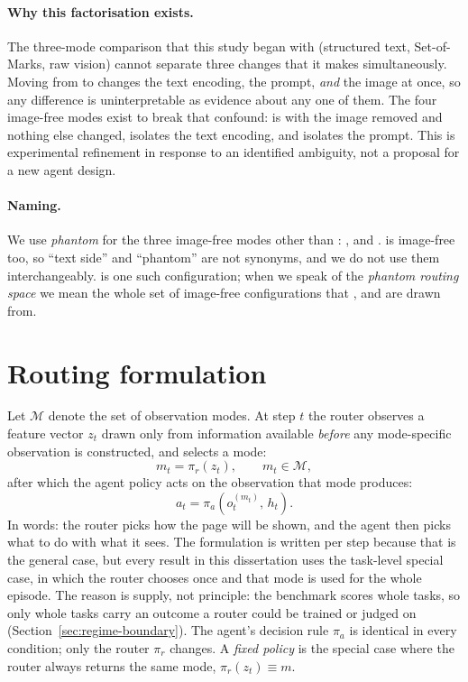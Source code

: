 \paragraph{Why this factorisation exists.} The three-mode comparison that this study began with (structured text, Set-of-Marks, raw vision) cannot separate three changes that it makes simultaneously. Moving from \mDOM{} to
\mSoM{} changes the text encoding, the prompt, \emph{and} the image at once, so
any difference is uninterpretable as evidence about any one of them. The four
image-free modes exist to break that confound: \mPS{} is \mSoM{} with the image
removed and nothing else changed, \mPT{} isolates the text encoding, and \mPP{}
isolates the prompt. This is experimental refinement in response to an
identified ambiguity, not a proposal for a new agent design.

\paragraph{Naming.} We use \emph{phantom} for the three image-free modes other than \mDOM{}: \mPT{}, \mPP{} and \mPS{}. \mDOM{} is image-free too,
so ``text side'' and ``phantom'' are not synonyms, and we do not use them
interchangeably. \mPS{} is one such configuration; when we speak of the
\emph{phantom routing space} we mean the whole set of image-free
configurations that \mPT{}, \mPP{} and \mPS{} are drawn from.

\FloatBarrier
\section{Routing formulation}
\label{sec:router-formulation}

Let $\mathcal{M}$ denote the set of observation modes. At step $t$ the router
observes a feature vector $z_t$ drawn only from information available
\emph{before} any mode-specific observation is constructed, and selects a mode:
\begin{equation}
  m_t = \pi_r(z_t), \qquad m_t \in \mathcal{M},
  \label{eq:router}
\end{equation}
after which the agent policy acts on the observation that mode produces:
\begin{equation}
  a_t = \pi_a\!\left(o_t^{(m_t)},\, h_t\right).
  \label{eq:agent}
\end{equation}
In words: the router picks how the page will be shown, and the agent then
picks what to do with what it sees. The formulation is written per step
because that is the general case, but every result in this dissertation uses
the task-level special case, in which the router chooses once and that mode is
used for the whole episode. The reason is supply, not principle: the benchmark
scores whole tasks, so only whole tasks carry an outcome a router could be
trained or judged on (Section~\ref{sec:regime-boundary}). The agent's decision rule $\pi_a$ is
identical in every condition; only the router $\pi_r$ changes. A \emph{fixed
policy} is the special case where the router always returns the same mode,
$\pi_r(z_t) \equiv m$.

